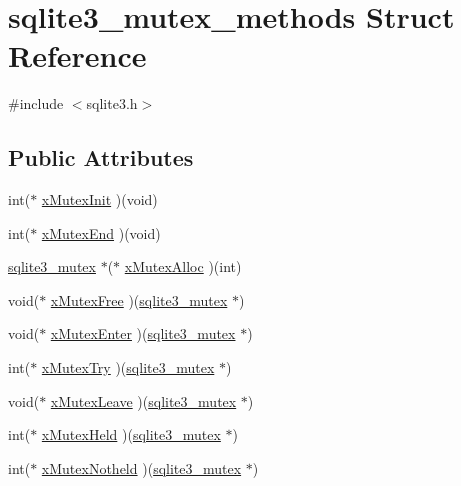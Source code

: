 \hypertarget{structsqlite3__mutex__methods}{}\section{sqlite3\+\_\+mutex\+\_\+methods Struct Reference}
\label{structsqlite3__mutex__methods}


{\ttfamily \#include $<$sqlite3.\+h$>$}

\subsection*{Public Attributes}
\begin{DoxyCompactItemize}
\item 
int($\ast$ \mbox{\hyperlink{structsqlite3__mutex__methods_a1a163f0e0eaed85223b1537434df635a}{x\+Mutex\+Init}} )(void)
\item 
int($\ast$ \mbox{\hyperlink{structsqlite3__mutex__methods_ab3bc5e370edbeb1db4199d5f609fb09f}{x\+Mutex\+End}} )(void)
\item 
\mbox{\hyperlink{sqlite3_8h_a0f546860bde03fddb33a9fed920da05c}{sqlite3\+\_\+mutex}} $\ast$($\ast$ \mbox{\hyperlink{structsqlite3__mutex__methods_a1c6c36e7f710a5bb8564946595cba324}{x\+Mutex\+Alloc}} )(int)
\item 
void($\ast$ \mbox{\hyperlink{structsqlite3__mutex__methods_a632046a2d4a6372a567a5ac5e8175b30}{x\+Mutex\+Free}} )(\mbox{\hyperlink{sqlite3_8h_a0f546860bde03fddb33a9fed920da05c}{sqlite3\+\_\+mutex}} $\ast$)
\item 
void($\ast$ \mbox{\hyperlink{structsqlite3__mutex__methods_a0237ae1928c2edab7be16e9e007f6a02}{x\+Mutex\+Enter}} )(\mbox{\hyperlink{sqlite3_8h_a0f546860bde03fddb33a9fed920da05c}{sqlite3\+\_\+mutex}} $\ast$)
\item 
int($\ast$ \mbox{\hyperlink{structsqlite3__mutex__methods_aa65a38cee32246dc3257a80ce47be5fe}{x\+Mutex\+Try}} )(\mbox{\hyperlink{sqlite3_8h_a0f546860bde03fddb33a9fed920da05c}{sqlite3\+\_\+mutex}} $\ast$)
\item 
void($\ast$ \mbox{\hyperlink{structsqlite3__mutex__methods_a0d4ef78481d18de5f9346f80321a17b1}{x\+Mutex\+Leave}} )(\mbox{\hyperlink{sqlite3_8h_a0f546860bde03fddb33a9fed920da05c}{sqlite3\+\_\+mutex}} $\ast$)
\item 
int($\ast$ \mbox{\hyperlink{structsqlite3__mutex__methods_a71a26118133388426ddf18ab59ce87f5}{x\+Mutex\+Held}} )(\mbox{\hyperlink{sqlite3_8h_a0f546860bde03fddb33a9fed920da05c}{sqlite3\+\_\+mutex}} $\ast$)
\item 
int($\ast$ \mbox{\hyperlink{structsqlite3__mutex__methods_a5b7c9daa7aea5f01ef9fa58f6d1c5cb1}{x\+Mutex\+Notheld}} )(\mbox{\hyperlink{sqlite3_8h_a0f546860bde03fddb33a9fed920da05c}{sqlite3\+\_\+mutex}} $\ast$)
\end{DoxyCompactItemize}



